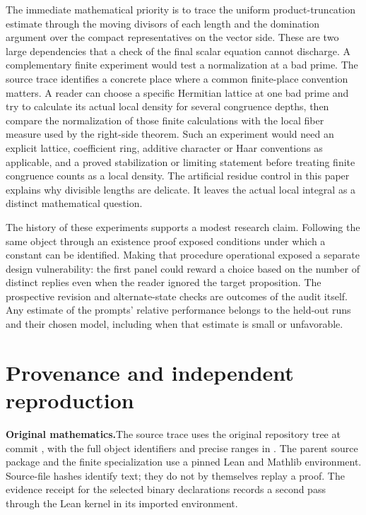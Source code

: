 \documentclass[12pt,letterpaper]{article}
\newcommand{\code}[1]{\texttt{\detokenize{#1}}}
\newcommand{\reading}[2]{\par\smallskip\textsf{\color{accent}\bfseries #1}\enspace #2\par}
\begin{document}
The immediate mathematical priority is to trace the uniform product-truncation estimate through the moving divisors of each length and the domination argument over the compact representatives on the vector side. These are two large dependencies that a check of the final scalar equation cannot discharge. A complementary finite experiment would test a normalization at a bad prime. The source trace identifies a concrete place where a common finite-place convention matters. A reader can choose a specific Hermitian lattice at one bad prime and try to calculate its actual local density for several congruence depths, then compare the normalization of those finite calculations with the local fiber measure used by the right-side theorem. Such an experiment would need an explicit lattice, coefficient ring, additive character or Haar conventions as applicable, and a proved stabilization or limiting statement before treating finite congruence counts as a local density. The artificial residue control in this paper explains why divisible lengths are delicate. It leaves the actual local integral as a distinct mathematical question.

The history of these experiments supports a modest research claim. Following the same object through an existence proof exposed conditions under which a constant can be identified. Making that procedure operational exposed a separate design vulnerability: the first panel could reward a choice based on the number of distinct replies even when the reader ignored the target proposition. The prospective revision and alternate-state checks are outcomes of the audit itself. Any estimate of the prompts' relative performance belongs to the held-out runs and their chosen model, including when that estimate is small or unfavorable.

\section{Provenance and independent reproduction}

\reading{Original mathematics.}{The source trace uses the original repository tree at commit \code{40e56bab}, with the full object identifiers and precise ranges in \code{binary/source_manifest.json}. The parent source package and the finite specialization use a pinned Lean and Mathlib environment. Source-file hashes identify text; they do not by themselves replay a proof. The evidence receipt for the selected binary declarations records a second pass through the Lean kernel in its imported environment.}
\end{document}
